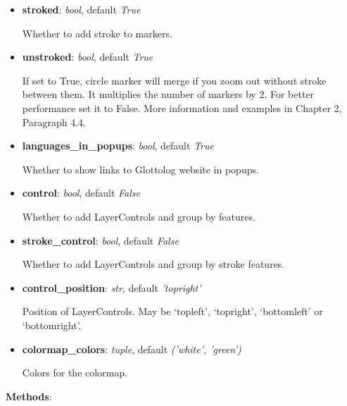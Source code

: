 \documentclass[a4paper,12pt]{article}
\begin{document}
\begin{itemize}
 \item \textbf{stroked}: \textit{bool}, default \textit{True}
 
 Whether to add stroke to markers.

 \item \textbf{unstroked}: \textit{bool}, default \textit{True}
 
 If set to True, circle marker will merge if you zoom out without stroke between them. It multiplies the number of markers by 2. For better performance set it to False. More information and examples in Chapter 2, Paragraph 4.4.
 
 \item \textbf{languages\_in\_popups}: \textit{bool}, default \textit{True}
 
 Whether to show links to Glottolog website in popups.
 
 \item \textbf{control}: \textit{bool}, default \textit{False}
 
 Whether to add LayerControls and group by features.

 \item \textbf{stroke\_control}: \textit{bool}, default \textit{False}
 
 Whether to add LayerControls and group by stroke features.
 
 \item \textbf{control\_position}: \textit{str}, default \textit{'topright'}
 
 Position of LayerControls. May be ‘topleft’, ‘topright’, ‘bottomleft’ or ‘bottomright’.

 \item \textbf{colormap\_colors}: \textit{tuple}, default \textit{('white', 'green')}
 
 Colors for the colormap.

\end{itemize}
\bigskip

\textbf{Methods}:
\end{document}
